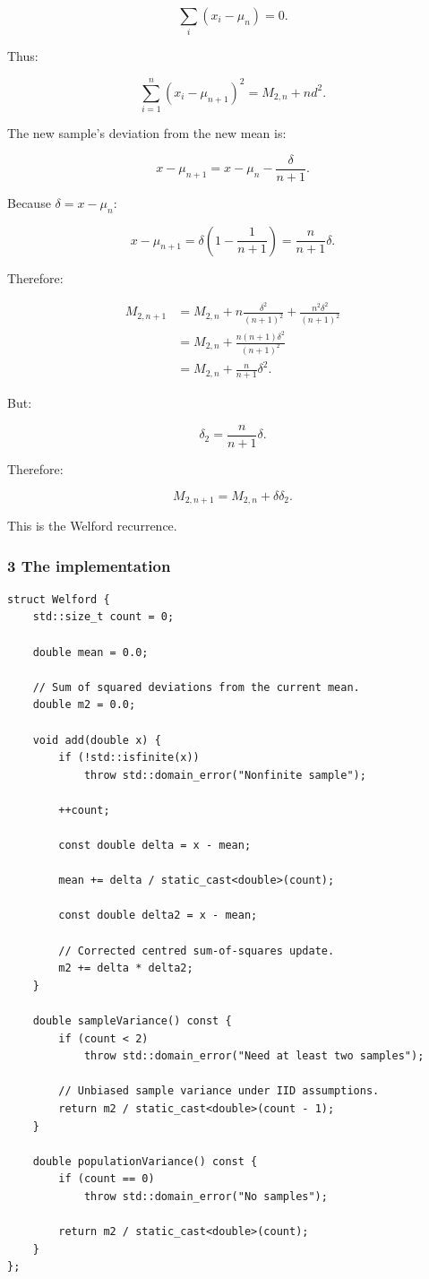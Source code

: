 \[
 \sum_i(x_i-\mu_n)=0.
\]

Thus:

\[
 \sum_{i=1}^{n}(x_i-\mu_{n+1})^2 = M_{2,n}+nd^2.
\]

The new sample's deviation from the new mean is:

\[
 x-\mu_{n+1} = x-\mu_n-\frac{\delta}{n+1}.
\]

Because \(\delta=x-\mu_n\):

\[
 x-\mu_{n+1} = \delta\left(1-\frac1{n+1}\right) = \frac{n}{n+1}\delta.
\]

Therefore:

\[
 \begin{aligned} M_{2,n+1} &= M_{2,n} +n\frac{\delta^2}{(n+1)^2} +\frac{n^2\delta^2}{(n+1)^2}\\ &= M_{2,n} +\frac{n(n+1)\delta^2}{(n+1)^2}\\ &= M_{2,n}+\frac{n}{n+1}\delta^2. \end{aligned}
\]

But:

\[
 \delta_2=\frac{n}{n+1}\delta.
\]

Therefore:

\[
 \boxed{ M_{2,n+1} = M_{2,n}+\delta\delta_2 }.
\]

This is the Welford recurrence.

\subsubsection{3 The implementation}\label{02-foundations-ii-ch030-the-implementation}

\begin{verbatim}
struct Welford {
    std::size_t count = 0;

    double mean = 0.0;

    // Sum of squared deviations from the current mean.
    double m2 = 0.0;

    void add(double x) {
        if (!std::isfinite(x))
            throw std::domain_error("Nonfinite sample");

        ++count;

        const double delta = x - mean;

        mean += delta / static_cast<double>(count);

        const double delta2 = x - mean;

        // Corrected centred sum-of-squares update.
        m2 += delta * delta2;
    }

    double sampleVariance() const {
        if (count < 2)
            throw std::domain_error("Need at least two samples");

        // Unbiased sample variance under IID assumptions.
        return m2 / static_cast<double>(count - 1);
    }

    double populationVariance() const {
        if (count == 0)
            throw std::domain_error("No samples");

        return m2 / static_cast<double>(count);
    }
};
\end{verbatim}


